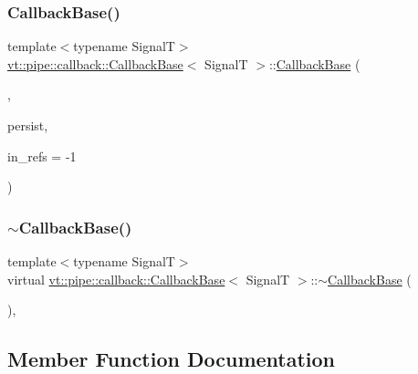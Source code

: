\subsubsection{\texorpdfstring{Callback\+Base()}{CallbackBase()}\hspace{0.1cm}{\footnotesize\ttfamily [7/7]}}
{\footnotesize\ttfamily template$<$typename SignalT$>$ \\
\hyperlink{structvt_1_1pipe_1_1callback_1_1_callback_base}{vt\+::pipe\+::callback\+::\+Callback\+Base}$<$ SignalT $>$\+::\hyperlink{structvt_1_1pipe_1_1callback_1_1_callback_base}{Callback\+Base} (\begin{DoxyParamCaption}\item[{Callback\+Explicit\+Tag\+Type}]{,  }\item[{bool const \&}]{persist,  }\item[{\hyperlink{namespacevt_ace18d74dd489d9ea506d38789fffce34}{Pipe\+Ref\+Type} const \&}]{in\+\_\+refs = {\ttfamily -\/1} }\end{DoxyParamCaption})\hspace{0.3cm}{\ttfamily [inline]}}

\mbox{\label{structvt_1_1pipe_1_1callback_1_1_callback_base_adc39148be97af3105f9b5765431bdc9a}} 
\subsubsection{\texorpdfstring{$\sim$\+Callback\+Base()}{~CallbackBase()}}
{\footnotesize\ttfamily template$<$typename SignalT$>$ \\
virtual \hyperlink{structvt_1_1pipe_1_1callback_1_1_callback_base}{vt\+::pipe\+::callback\+::\+Callback\+Base}$<$ SignalT $>$\+::$\sim$\hyperlink{structvt_1_1pipe_1_1callback_1_1_callback_base}{Callback\+Base} (\begin{DoxyParamCaption}{ }\end{DoxyParamCaption})\hspace{0.3cm}{\ttfamily [virtual]}, {\ttfamily [default]}}



\subsection{Member Function Documentation}
\mbox{\label{structvt_1_1pipe_1_1callback_1_1_callback_base_a9ef1595197b291a660e6d19aadb0203e}} 
